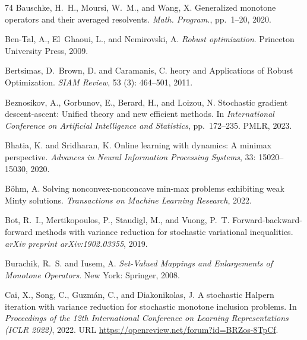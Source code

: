 \documentclass{article}
\theoremstyle{plain}
\theoremstyle{definition}
\theoremstyle{remark}
\begin{document}
\begin{thebibliography}{74}
Bauschke, H.~H., Moursi, W.~M., and Wang, X.
\newblock Generalized monotone operators and their averaged resolvents.
\newblock \emph{Math. Program.}, pp.\  1--20, 2020.

Ben-Tal, A., El~Ghaoui, L., and Nemirovski, A.
\newblock \emph{{R}obust optimization}.
\newblock Princeton University Press, 2009.

Bertsimas, D.~Brown, D. and Caramanis, C.
heory and {A}pplications of {R}obust {O}ptimization.
\newblock \emph{SIAM Review}, 53 (3): 464--501, 2011.

Beznosikov, A., Gorbunov, E., Berard, H., and Loizou, N.
\newblock Stochastic gradient descent-ascent: Unified theory and new efficient
  methods.
\newblock In \emph{International Conference on Artificial Intelligence and
  Statistics}, pp.\  172--235. PMLR, 2023.

Bhatia, K. and Sridharan, K.
\newblock Online learning with dynamics: {A} minimax perspective.
\newblock \emph{Advances in Neural Information Processing Systems},
  33: 15020--15030, 2020.

B{\"o}hm, A.
\newblock Solving nonconvex-nonconcave min-max problems exhibiting weak {M}inty
  solutions.
\newblock \emph{Transactions on Machine Learning Research}, 2022.

Bot, R.~I., Mertikopoulos, P., Staudigl, M., and Vuong, P.~T.
\newblock Forward-backward-forward methods with variance reduction for
  stochastic variational inequalities.
\newblock \emph{arXiv preprint arXiv:1902.03355}, 2019.

Burachik, R.~S. and Iusem, A.
\newblock \emph{Set-Valued Mappings and Enlargements of Monotone Operators}.
\newblock New York: Springer, 2008.

Cai, X., Song, C., Guzm\'{a}n, C., and Diakonikolas, J.
\newblock A stochastic {H}alpern iteration with variance reduction for
  stochastic monotone inclusion problems.
\newblock In \emph{Proceedings of the 12th International Conference on Learning
  Representations (ICLR 2022)}, 2022.
\newblock URL \url{https://openreview.net/forum?id=BRZos-8TpCf}.


\end{thebibliography}
\end{document}
